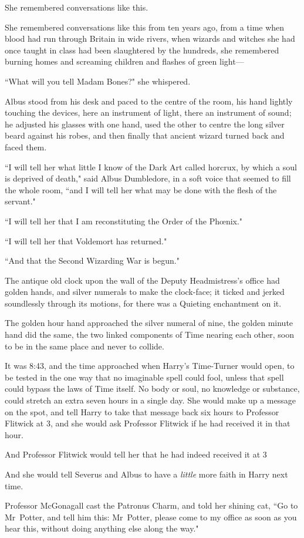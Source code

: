 She remembered conversations like this.

She remembered conversations like this from ten years ago, from a time when blood had run through Britain in wide rivers, when wizards and witches she had once taught in class had been slaughtered by the hundreds, she remembered burning homes and screaming children and flashes of green light—

``What will you tell Madam Bones?" she whispered.

Albus stood from his desk and paced to the centre of the room, his hand lightly touching the devices, here an instrument of light, there an instrument of sound; he adjusted his glasses with one hand, used the other to centre the long silver beard against his robes, and then finally that ancient wizard turned back and faced them.

``I will tell her what little I know of the Dark Art called horcrux, by which a soul is deprived of death," said Albus Dumbledore, in a soft voice that seemed to fill the whole room, ``and I will tell her what may be done with the flesh of the servant."

``I will tell her that I am reconstituting the Order of the Phœnix."

``I will tell her that Voldemort has returned."

``And that the Second Wizarding War is begun."


The antique old clock upon the wall of the Deputy Headmistress's office had golden hands, and silver numerals to make the clock-face; it ticked and jerked soundlessly through its motions, for there was a Quieting enchantment on it.

The golden hour hand approached the silver numeral of nine, the golden minute hand did the same, the two linked components of Time nearing each other, soon to be in the same place and never to collide.

It was 8:43\pm, and the time approached when Harry's Time-Turner would open, to be tested in the one way that no imaginable spell could fool, unless that spell could bypass the laws of Time itself. No body or soul, no knowledge or substance, could stretch an extra seven hours in a single day. She would make up a message on the spot, and tell Harry to take that message back six hours to Professor Flitwick at 3\pm, and she would ask Professor Flitwick if he had received it in that hour.

And Professor Flitwick would tell her that he had indeed received it at 3\pm

And she would tell Severus and Albus to have a \emph{little} more faith in Harry next time.

Professor McGonagall cast the Patronus Charm, and told her shining cat, ``Go to Mr~Potter, and tell him this: Mr~Potter, please come to my office as soon as you hear this, without doing anything else along the way."

